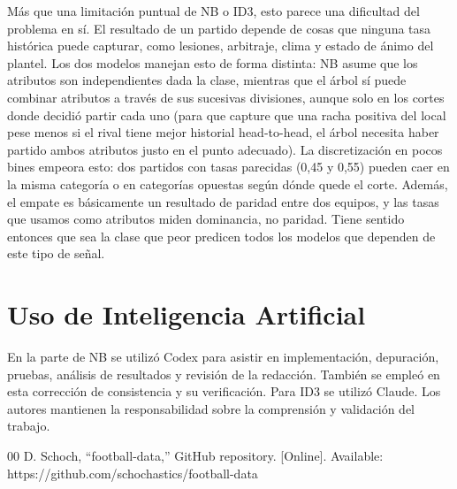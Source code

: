 \documentclass[conference]{IEEEtran}
\begin{document}
Más que una limitación puntual de NB o ID3, esto parece una dificultad del problema en sí. El resultado de un partido depende de cosas que ninguna tasa histórica puede capturar, como lesiones, arbitraje, clima y estado de ánimo del plantel. Los dos modelos manejan esto de forma distinta: NB asume que los atributos son independientes dada la clase, mientras que el árbol sí puede combinar atributos a través de sus sucesivas divisiones, aunque solo en los cortes donde decidió partir cada uno (para que capture que una racha positiva del local pese menos si el rival tiene mejor historial head-to-head, el árbol necesita haber partido ambos atributos justo en el punto adecuado). La discretización en pocos bines empeora esto: dos partidos con tasas parecidas (0,45 y 0,55) pueden caer en la misma categoría o en categorías opuestas según dónde quede el corte. Además, el empate es básicamente un resultado de paridad entre dos equipos, y las tasas que usamos como atributos miden dominancia, no paridad. Tiene sentido entonces que sea la clase que peor predicen todos los modelos que dependen de este tipo de señal.

\section*{Uso de Inteligencia Artificial}
En la parte de NB se utilizó Codex para asistir en implementación, depuración, pruebas, análisis de resultados y revisión de la redacción. También se empleó en esta corrección de consistencia y su verificación. Para ID3 se utilizó Claude. Los autores mantienen la responsabilidad sobre la comprensión y validación del trabajo.

\begin{thebibliography}{00}
 D. Schoch, ``football-data,'' GitHub repository. [Online]. Available: https://github.com/schochastics/football-data
\end{thebibliography}
\end{document}
